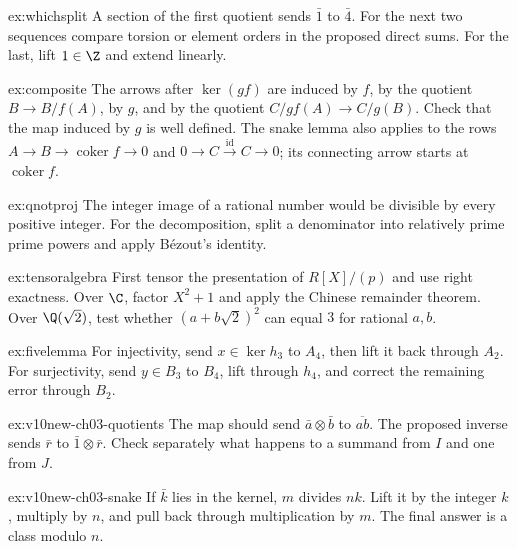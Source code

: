 \begin{hint}{ex:whichsplit}
A section of the first quotient sends $\bar1$ to $\bar4$. For the next two sequences compare torsion or element orders in the proposed direct sums. For the last, lift $1\in\Z$ and extend linearly.
\end{hint}

\begin{hint}{ex:composite}
The arrows after $\ker(gf)$ are induced by $f$, by the quotient $B\to B/f(A)$, by $g$, and by the quotient $C/gf(A)\to C/g(B)$. Check that the map induced by $g$ is well defined. The snake lemma also applies to the rows $A\to B\to\operatorname{coker}f\to0$ and $0\to C\xrightarrow{\mathrm{id}}C\to0$; its connecting arrow starts at $\operatorname{coker}f$.
\end{hint}

\begin{hint}{ex:qnotproj}
The integer image of a rational number would be divisible by every positive integer. For the decomposition, split a denominator into relatively prime prime powers and apply Bézout's identity.
\end{hint}

\begin{hint}{ex:tensoralgebra}
First tensor the presentation of $R[X]/(p)$ and use right exactness. Over $\C$, factor $X^2+1$ and apply the Chinese remainder theorem. Over $\Q(\sqrt2)$, test whether $(a+b\sqrt2)^2$ can equal $3$ for rational $a,b$.
\end{hint}

\begin{hint}{ex:fivelemma}
For injectivity, send $x\in\ker h_3$ to $A_4$, then lift it back through $A_2$. For surjectivity, send $y\in B_3$ to $B_4$, lift through $h_4$, and correct the remaining error through $B_2$.
\end{hint}

\begin{hint}{ex:v10new-ch03-quotients}
The map should send $\bar a\otimes\bar b$ to $\overline{ab}$. The proposed inverse sends $\bar r$ to $\bar1\otimes\bar r$. Check separately what happens to a summand from $I$ and one from $J$.
\end{hint}

\begin{hint}{ex:v10new-ch03-snake}
If $\bar k$ lies in the kernel, $m$ divides $nk$. Lift it by the integer $k$, multiply by $n$, and pull back through multiplication by $m$. The final answer is a class modulo $n$.
\end{hint}

